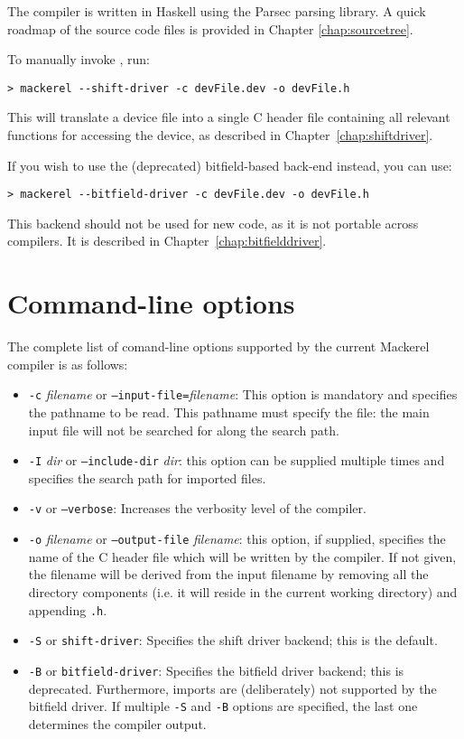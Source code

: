 \documentclass[a4paper,11pt,twoside]{report}
\begin{document}
The \Mac compiler is written in Haskell using the Parsec parsing
library.  A quick roadmap of the source code files is provided in
Chapter \ref{chap:sourcetree}. 

To manually invoke \Mac, run:

\verb~> mackerel --shift-driver -c devFile.dev -o devFile.h~

This will translate a device file into a single C header file containing all
relevant functions for accessing the device, as described in
Chapter~\ref{chap:shiftdriver}. 

If you wish to use the (deprecated) bitfield-based back-end instead,
you can use:

\verb~> mackerel --bitfield-driver -c devFile.dev -o devFile.h~

This backend should not be used for new code, as it is not portable
across compilers.  It is described in
Chapter~\ref{chap:bitfielddriver}. 

\section{Command-line options}

The complete list of comand-line options supported by the current
Mackerel compiler is as follows:
\begin{itemize}
\item \texttt{-c} \textit{filename} or
  \texttt{--input-file=}\textit{filename}: This option is mandatory
  and specifies the pathname to be read.  This pathname must specify
  the file: the main input file will not be searched for along the
  search path. 

\item \texttt{-I} \textit{dir} or \texttt{--include-dir}
  \textit{dir}: this option can be supplied multiple times and
  specifies the search path for imported files. 

\item \texttt{-v} or \texttt{--verbose}: Increases the verbosity level
  of the compiler.

\item \texttt{-o} \textit{filename} or \texttt{--output-file}
  \textit{filename}: this option, if supplied, specifies the name of
  the C header file which will be written by the compiler.  If not
  given, the filename will be derived from the input filename by
  removing all the directory components (i.e. it will reside in the
  current working directory) and appending \texttt{.h}.

\item \texttt{-S} or \texttt{shift-driver}: Specifies the shift driver
  backend; this is the default. 

\item \texttt{-B} or \texttt{bitfield-driver}: Specifies the bitfield
  driver backend; this is deprecated.  Furthermore, imports are
  (deliberately) not supported by the bitfield driver.  If multiple
  \texttt{-S} and \texttt{-B} options are specified, the last one
  determines the compiler output. 

\end{itemize}
\end{document}
